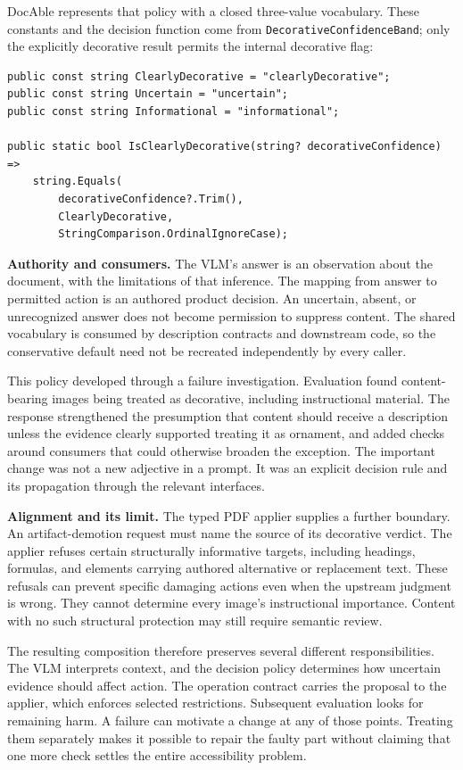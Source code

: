 DocAble represents that policy with a closed three-value vocabulary. These constants and the decision function come from \texttt{DecorativeConfidenceBand}; only the explicitly decorative result permits the internal decorative flag:

\begin{verbatim}
public const string ClearlyDecorative = "clearlyDecorative";
public const string Uncertain = "uncertain";
public const string Informational = "informational";

public static bool IsClearlyDecorative(string? decorativeConfidence) =>
    string.Equals(
        decorativeConfidence?.Trim(),
        ClearlyDecorative,
        StringComparison.OrdinalIgnoreCase);
\end{verbatim}

\textbf{Authority and consumers.} The VLM's answer is an observation about the document, with the limitations of that inference. The mapping from answer to permitted action is an authored product decision. An uncertain, absent, or unrecognized answer does not become permission to suppress content. The shared vocabulary is consumed by description contracts and downstream code, so the conservative default need not be recreated independently by every caller.

This policy developed through a failure investigation. Evaluation found content-bearing images being treated as decorative, including instructional material. The response strengthened the presumption that content should receive a description unless the evidence clearly supported treating it as ornament, and added checks around consumers that could otherwise broaden the exception. The important change was not a new adjective in a prompt. It was an explicit decision rule and its propagation through the relevant interfaces.

\textbf{Alignment and its limit.} The typed PDF applier supplies a further boundary. An artifact-demotion request must name the source of its decorative verdict. The applier refuses certain structurally informative targets, including headings, formulas, and elements carrying authored alternative or replacement text. These refusals can prevent specific damaging actions even when the upstream judgment is wrong. They cannot determine every image's instructional importance. Content with no such structural protection may still require semantic review.

The resulting composition therefore preserves several different responsibilities. The VLM interprets context, and the decision policy determines how uncertain evidence should affect action. The operation contract carries the proposal to the applier, which enforces selected restrictions. Subsequent evaluation looks for remaining harm. A failure can motivate a change at any of those points. Treating them separately makes it possible to repair the faulty part without claiming that one more check settles the entire accessibility problem.

